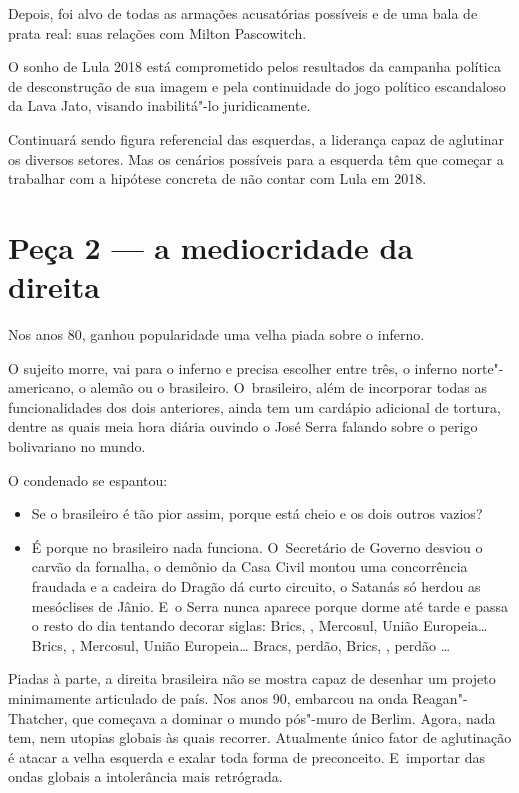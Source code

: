 Depois, foi alvo de todas as armações acusatórias possíveis e de uma
bala de prata real: suas relações com Milton Pascowitch.

O sonho de Lula 2018 está comprometido pelos resultados da campanha
política de desconstrução de sua imagem e pela continuidade do jogo
político escandaloso da Lava Jato, visando inabilitá"-lo juridicamente.

Continuará sendo figura referencial das esquerdas, a liderança capaz de
aglutinar os diversos setores. Mas os cenários possíveis para a esquerda
têm que começar a trabalhar com a hipótese concreta de não contar com
Lula em 2018.

\section{Peça 2 --- a mediocridade da direita}

Nos anos 80, ganhou popularidade uma velha piada sobre o inferno.~

O sujeito morre, vai para o inferno e precisa escolher entre três, o
inferno norte"-americano, o alemão ou o brasileiro. O~brasileiro, além de
incorporar todas as~ funcionalidades dos dois anteriores, ainda tem um
cardápio adicional de tortura, dentre as quais meia hora diária ouvindo
o José Serra falando sobre o perigo bolivariano no mundo.

O condenado se espantou:

\begin{itemize}
\itemsep1pt\parskip0pt
\item
  Se o brasileiro é tão pior assim, porque está cheio e os dois outros
  vazios?
\item
  É porque no brasileiro nada funciona. O~Secretário de Governo desviou
  o carvão da fornalha, o demônio da Casa Civil montou uma concorrência
  fraudada e a cadeira do Dragão dá curto circuito, o Satanás só herdou
  as mesóclises de Jânio. E~o Serra nunca aparece porque dorme até tarde
  e passa o resto do dia tentando decorar siglas: Brics, , Mercosul,
  União Europeia… Brics, , Mercosul, União Europeia…
  Bracs, perdão, Brics, , perdão …
\end{itemize}

Piadas à parte, a direita brasileira não se mostra capaz de desenhar um
projeto minimamente articulado de país. Nos anos 90, embarcou na onda
Reagan"-Thatcher, que começava a dominar o mundo pós"-muro de Berlim.
Agora, nada tem, nem utopias globais às quais recorrer. Atualmente único
fator de aglutinação é atacar a velha esquerda e exalar toda forma de
preconceito. E~importar das ondas globais a intolerância mais
retrógrada.

